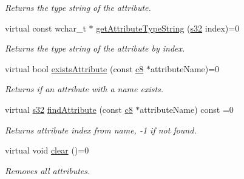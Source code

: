 \begin{DoxyCompactItemize}
\begin{DoxyCompactList}\small\item\em Returns the type string of the attribute. \end{DoxyCompactList}\item 
virtual const wchar\+\_\+t $\ast$ \hyperlink{classirr_1_1io_1_1IAttributes_a2dc2dffe38bc50222615f40a7ca7711a}{get\+Attribute\+Type\+String} (\hyperlink{namespaceirr_ac66849b7a6ed16e30ebede579f9b47c6}{s32} index)=0
\begin{DoxyCompactList}\small\item\em Returns the type string of the attribute by index. \end{DoxyCompactList}\item 
\mbox{\label{classirr_1_1io_1_1IAttributes_ae2b4783b220e424269beee14674babb3}} 
virtual bool \hyperlink{classirr_1_1io_1_1IAttributes_ae2b4783b220e424269beee14674babb3}{exists\+Attribute} (const \hyperlink{namespaceirr_a9395eaea339bcb546b319e9c96bf7410}{c8} $\ast$attribute\+Name)=0
\begin{DoxyCompactList}\small\item\em Returns if an attribute with a name exists. \end{DoxyCompactList}\item 
\mbox{\label{classirr_1_1io_1_1IAttributes_abda2f84c5b87d69d9008485740afcb7c}} 
virtual \hyperlink{namespaceirr_ac66849b7a6ed16e30ebede579f9b47c6}{s32} \hyperlink{classirr_1_1io_1_1IAttributes_abda2f84c5b87d69d9008485740afcb7c}{find\+Attribute} (const \hyperlink{namespaceirr_a9395eaea339bcb546b319e9c96bf7410}{c8} $\ast$attribute\+Name) const =0
\begin{DoxyCompactList}\small\item\em Returns attribute index from name, -\/1 if not found. \end{DoxyCompactList}\item 
\mbox{\label{classirr_1_1io_1_1IAttributes_ab33109fc1b62432973a49b794231a061}} 
virtual void \hyperlink{classirr_1_1io_1_1IAttributes_ab33109fc1b62432973a49b794231a061}{clear} ()=0
\begin{DoxyCompactList}\small\item\em Removes all attributes. \end{DoxyCompactList}\item 

\end{DoxyCompactItemize}
